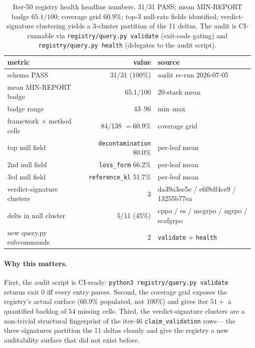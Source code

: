 \begin{table}[t]
\centering\small
\caption{Iter-50 registry health headline numbers. 31/31 PASS;
mean MIN-REPORT badge $65.1/100$; coverage grid $60.9\%$;
top-3 null-rate fields identified; verdict-signature clustering
yields a 3-cluster partition of the 11 deltas. The audit is
CI-runnable via \texttt{registry/query.py validate} (exit-code
gating) and \texttt{registry/query.py health} (delegates to the
audit script).}
\label{tab:p6-registry-health}
\begin{tabular}{l r l}
\toprule
metric & value & source \\
\midrule
schema PASS                & 31/31 (100\%) & audit re-run 2026-07-05 \\
mean MIN-REPORT badge      & 65.1/100     & 20-stack mean \\
badge range                & 43--96       & min--max \\
framework $\times$ method cells & 84/138 $=60.9\%$ & coverage grid \\
top null field             & \texttt{decontamination} 80.0\% & per-leaf mean \\
2nd null field             & \texttt{loss\_form} 66.2\% & per-leaf mean \\
3rd null field             & \texttt{reference\_kl} 51.7\% & per-leaf mean \\
verdict-signature clusters & 3            & da39a3ee5e / c6f8df4ce9 / 13255b77ea \\
delts in null cluster      & 5/11 (45\%)  & cppo / es / mcgrpo / ngrpo / scafgrpo \\
new query.py subcommands   & 2            & \texttt{validate} + \texttt{health} \\
\bottomrule
\end{tabular}
\end{table}

\paragraph{Why this matters.}
First, the audit script is CI-ready: \texttt{python3 registry/query.py
validate} returns exit $0$ iff every entry parses. Second, the coverage
grid exposes the registry's actual surface ($60.9\%$ populated, not
$100\%$) and gives iter $51+$ a quantified backlog of $54$ missing
cells. Third, the verdict-signature clusters are a non-trivial
structural fingerprint of the iter-46 \texttt{claim\_validation} rows---
the three signatures partition the 11 deltas cleanly and give the
registry a new auditability surface that did not exist before.

